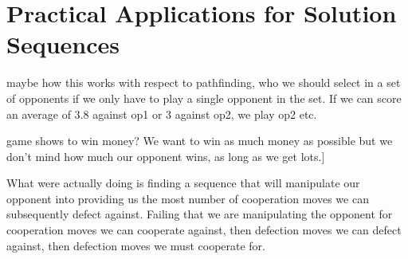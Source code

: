 \chapter{Practical Applications for Solution Sequences}\label{ch:applications}

maybe how this works with respect to pathfinding, who we should select in a set of opponents if we only have to play a single opponent in the set.
If we can score an average of 3.8 against op1 or 3 against op2, we play op2 etc.

game shows to win money?
We want to win as much money as possible but we don't mind how much our opponent wins, as long as we get lots.]

What were actually doing is finding a sequence that will manipulate our opponent into providing us the most number of cooperation moves we can subsequently defect against.
Failing that we are manipulating the opponent for cooperation moves we can cooperate against, then defection moves we can defect against, then defection moves we must cooperate for.
